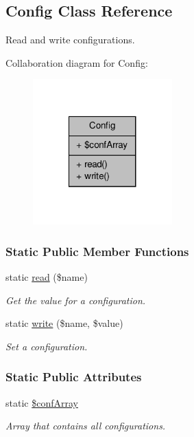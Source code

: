 \hypertarget{classConfig}{\subsection{Config Class Reference}
\label{classConfig}
}


Read and write configurations.  




Collaboration diagram for Config\-:\nopagebreak
\begin{figure}[H]
\begin{center}
\leavevmode
\includegraphics[width=152pt]{classConfig__coll__graph}
\end{center}
\end{figure}
\subsubsection*{Static Public Member Functions}
\begin{DoxyCompactItemize}
\item 
static \hyperlink{classConfig_a05b671c1d9906d653dfab37fc5dc1588}{read} (\$name)
\begin{DoxyCompactList}\small\item\em Get the value for a configuration. \end{DoxyCompactList}\item 
static \hyperlink{classConfig_a975f9e49fe4636732dbffacc62e3dbd9}{write} (\$name, \$value)
\begin{DoxyCompactList}\small\item\em Set a configuration. \end{DoxyCompactList}\end{DoxyCompactItemize}
\subsubsection*{Static Public Attributes}
\begin{DoxyCompactItemize}
\item 
\hypertarget{classConfig_abf0820c6706551fc7e0ce741c525545f}{static \hyperlink{classConfig_abf0820c6706551fc7e0ce741c525545f}{\$conf\-Array}}\label{classConfig_abf0820c6706551fc7e0ce741c525545f}

\begin{DoxyCompactList}\small\item\em Array that contains all configurations. \end{DoxyCompactList}\end{DoxyCompactItemize}


